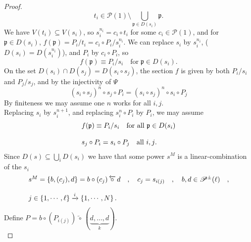 \documentclass[leqno]{article}
\newcommand{\pid}{\mathfrak{p}}
\newcommand{\biop}{\mathscr{P}}
\newcommand{\circleftarrow}{\,\overleftarrow{\circ}\,}
\numberwithin{equation}{section}
\begin{document}
\begin{proof}
\begin{equation*}
								t_{i}\in \biop(1)\setminus\bigcup\limits_{\mathfrak{p}\in D(s_{i})}\pid.
				\end{equation*}
				We have $V(t_{i})\subseteq V(s_{i})$, so $s_{i}^{n_i}=c_{i}\circ t_{i}$ for some
				$c_{i}\in \biop(1)$, and for $\mathfrak{p}\in D(s_{i})$, $f(\mathfrak{p})=P_{i}/t_{i}=c_{i}\circ
				P_{i}/s_{i}^{n_i}$. We can replace $s_{i}$ by $s_{i}^{n_i}$,
				($ D(s_{i})=D(s_{i}^{n_{i}})$), and $P_{i}$ by $c_{i}\circ P_{i}$, so 
				\begin{equation*}
								f(\mathfrak{p})\equiv P_{i}/s_{i}\quad \text{for}\; \mathfrak{p}\in D(s_{i}).
				\end{equation*}
				On the set $D(s_{i})\cap D(s_{j})=D(s_{i}\circ s_{j})$, the section $f$ is given
				by both $P_{i}/s_{i}$ and $P_{j}/s_{j}$, and by the injectivity  of $\Psi$ 
				\begin{equation*}
								(s_{i}\circ s_{j})^{n}\circ s_{j}\circ P_{i} = (s_{i}\circ
								s_{j})^{n}\circ s_{i}\circ P_{j}
				\end{equation*}
				By finiteness we may assume one $n$ works for all $i,j$. \vspace{.1cm}\\ 
				Replacing $s_{i}$ by
				$s_{i}^{n+1}$, and replacing $s_{i}^{n}\circ P_{i}$ by $P_{i}$, we may assume 
				\begin{equation*}
								\begin{array}[H]{l}
												f(\mathfrak{p})\equiv P_{i}/s_{i} \quad \text{for all
																$\mathfrak{p}\in
												D(s_{i})$} \\\\
												s_{j}\circ P_{i}= s_{i}\circ P_{j} \quad \text{all $i,j$.}
								\end{array}
				\end{equation*}
				Since $D(s)\subseteq \bigcup\limits_{i}D(s_{i})$ we have that some power
				$s^{M}$ is a linear-combination of the $s_{i}$
				\begin{equation*}
								\begin{array}[H]{l}
								s^{M}=\left\{ b,(c_{j}),d \right\} = b\circ (c_{j})\circleftarrow d \quad
								, \quad c_{j}=s_{i(j)}\quad ,\quad b,d\in \biop^{\pm}(\ell)\quad ,\\\\
								j\in \left\{ 1,\cdots , \ell \right\}\xrightarrow{i}\left\{
												1,\cdots, N
								\right\}.
								\end{array}
				\end{equation*}
				Define $P=b\circ (P_{i(j)})\circleftarrow (\underbrace{d,\ldots ,d}_{k})$. \\

\end{proof}
\end{document}
